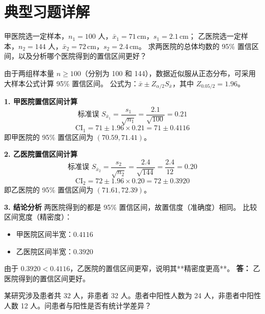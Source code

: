 \documentclass[lang=cn,10pt]{elegantbook}
\begin{document}
\chapter{典型习题详解}


\begin{exercise}
    甲医院选一定样本，$n_1=100$ 人，$\bar{x}_1=71\,\text{cm}$，$s_1=2.1\,\text{cm}$；
    乙医院选一定样本，$n_2=144$ 人，$\bar{x}_2=72\,\text{cm}$，$s_2=2.4\,\text{cm}$。
    求两医院的总体均数的 95\% 置信区间，以及分析哪个医院得到的置信区间更好？
\end{exercise}

\begin{solution}
    由于两组样本量 $n \ge 100$（分别为 100 和 144），数据近似服从正态分布，可采用大样本公式计算 95\% 置信区间。
    公式为：$\bar{x} \pm Z_{\alpha/2} S_{\bar{x}}$，其中 $Z_{0.05/2} = 1.96$。

    \textbf{1. 甲医院置信区间计算}
    \[
        \text{标准误 } S_{\bar{x}_1} = \frac{s_1}{\sqrt{n_1}} = \frac{2.1}{\sqrt{100}} = 0.21
    \]
    \[
        \text{CI}_1 = 71 \pm 1.96 \times 0.21 = 71 \pm 0.4116
    \]
    即甲医院的 95\% 置信区间为 $(70.59, 71.41)$。

    \textbf{2. 乙医院置信区间计算}
    \[
        \text{标准误 } S_{\bar{x}_2} = \frac{s_2}{\sqrt{n_2}} = \frac{2.4}{\sqrt{144}} = \frac{2.4}{12} = 0.20
    \]
    \[
        \text{CI}_2 = 72 \pm 1.96 \times 0.20 = 72 \pm 0.3920
    \]
    即乙医院的 95\% 置信区间为 $(71.61, 72.39)$。

    \textbf{3. 结论分析}
    两医院得到的都是 95\% 置信区间，故置信度（准确度）相同。
    比较区间宽度（精密度）：
    \begin{itemize}
        \item 甲医院区间半宽：$0.4116$
        \item 乙医院区间半宽：$0.3920$
    \end{itemize}
    由于 $0.3920 < 0.4116$，乙医院的置信区间更窄，说明其**精密度更高**。
    \textbf{答：} 乙医院得到的置信区间更好。
\end{solution}

\begin{exercise}
    某研究涉及患者共 32 人，非患者 32 人。患者中阳性人数为 24 人，非患者中阳性人数 12 人。问患者与阳性是否有统计学差异？
\end{exercise}
\end{document}
